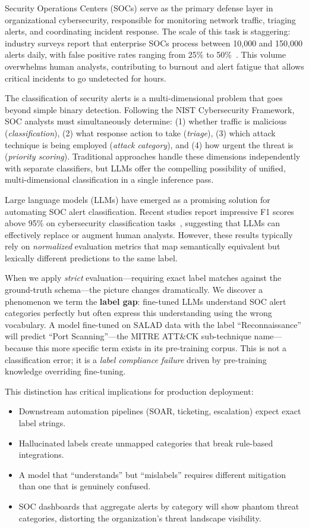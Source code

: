 \documentclass[journal]{IEEEtran}
\begin{document}
Security Operations Centers (SOCs) serve as the primary defense layer in organizational cybersecurity, responsible for monitoring network traffic, triaging alerts, and coordinating incident response. The scale of this task is staggering: industry surveys report that enterprise SOCs process between 10,000 and 150,000 alerts daily, with false positive rates ranging from 25\% to 50\%~\cite{ponemon2023}. This volume overwhelms human analysts, contributing to burnout and alert fatigue that allows critical incidents to go undetected for hours.

The classification of security alerts is a multi-dimensional problem that goes beyond simple binary detection. Following the NIST Cybersecurity Framework, SOC analysts must simultaneously determine: (1) whether traffic is malicious (\emph{classification}), (2) what response action to take (\emph{triage}), (3) which attack technique is being employed (\emph{attack category}), and (4) how urgent the threat is (\emph{priority scoring}). Traditional approaches handle these dimensions independently with separate classifiers, but LLMs offer the compelling possibility of unified, multi-dimensional classification in a single inference pass.

Large language models (LLMs) have emerged as a promising solution for automating SOC alert classification. Recent studies report impressive F1 scores above 95\% on cybersecurity classification tasks~\cite{ferrag2024,motlagh2024}, suggesting that LLMs can effectively replace or augment human analysts. However, these results typically rely on \emph{normalized} evaluation metrics that map semantically equivalent but lexically different predictions to the same label.

When we apply \emph{strict} evaluation---requiring exact label matches against the ground-truth schema---the picture changes dramatically. We discover a phenomenon we term the \textbf{label gap}: fine-tuned LLMs understand SOC alert categories perfectly but often express this understanding using the wrong vocabulary. A model fine-tuned on SALAD data with the label ``Reconnaissance'' will predict ``Port Scanning''---the MITRE ATT\&CK sub-technique name---because this more specific term exists in its pre-training corpus. This is not a classification error; it is a \emph{label compliance failure} driven by pre-training knowledge overriding fine-tuning.

This distinction has critical implications for production deployment:
\begin{itemize}
\item Downstream automation pipelines (SOAR, ticketing, escalation) expect exact label strings.
\item Hallucinated labels create unmapped categories that break rule-based integrations.
\item A model that ``understands'' but ``mislabels'' requires different mitigation than one that is genuinely confused.
\item SOC dashboards that aggregate alerts by category will show phantom threat categories, distorting the organization's threat landscape visibility.
\end{itemize}
\end{document}
